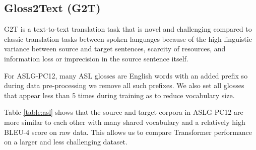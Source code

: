 \documentclass[11pt]{article}
\begin{document}
\subsection{Gloss2Text (G2T)}
\label{sec:layers}
 G2T is a text-to-text translation task that is novel and challenging compared to classic translation tasks between spoken languages because of the high linguistic variance between source and target sentences, scarcity of resources, and information loss or imprecision in the source sentence itself.
 
For ASLG-PC12, many ASL glosses are English words with an added prefix so during data pre-processing we remove all such prefixes. We also set all glosses that appear less than 5 times during training as  to reduce vocabulary size. 

\begin{center}
\label{table:asl}
\end{center}

Table \ref{table:asl} shows that the source and target corpora in ASLG-PC12 are more similar to each other with many shared vocabulary and a relatively high BLEU-4 score on raw data. This allows us to compare Transformer performance on a larger and less challenging dataset. 
\end{document}
